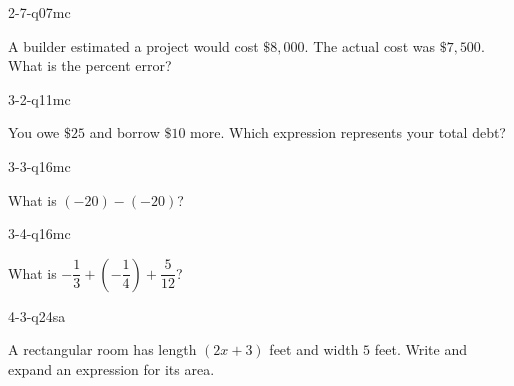 \documentclass[12pt, fleqn, openany]{studyGuide}
\begin{document}
\begin{practiceQuestion}{2-7-q07}{mc}
\begin{questionText}
A builder estimated a project would cost $\$8{,}000$. The actual cost was $\$7{,}500$. What is the percent error?
\end{questionText}
\end{practiceQuestion}

\begin{practiceQuestion}{3-2-q11}{mc}
\begin{questionText}
You owe $\$25$ and borrow $\$10$ more. Which expression represents your total debt?
\end{questionText}
\end{practiceQuestion}

\begin{practiceQuestion}{3-3-q16}{mc}
\begin{questionText}
What is $(-20) - (-20)$?
\end{questionText}
\end{practiceQuestion}

\begin{practiceQuestion}{3-4-q16}{mc}
\begin{questionText}
What is $-\dfrac{1}{3} + \left(-\dfrac{1}{4}\right) + \dfrac{5}{12}$?
\end{questionText}
\end{practiceQuestion}

\begin{practiceQuestion}{4-3-q24}{sa}
\begin{questionText}
A rectangular room has length $(2x + 3)$ feet and width $5$ feet. Write and expand an expression for its area.
\end{questionText}
\end{practiceQuestion}
\end{document}
